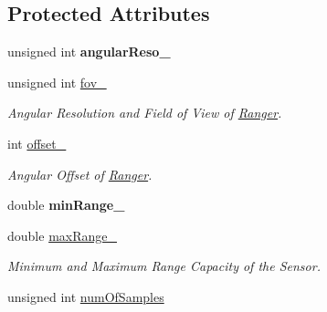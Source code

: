 \subsection*{Protected Attributes}
\begin{DoxyCompactItemize}
\item 
unsigned int {\bfseries angular\+Reso\+\_\+}\hypertarget{class_ranger_a53534cf242b7da6e4766016c24876d55}{}\label{class_ranger_a53534cf242b7da6e4766016c24876d55}

\item 
unsigned int \hyperlink{class_ranger_a013937201e2a4a516d4d36cac0193d68}{fov\+\_\+}\hypertarget{class_ranger_a013937201e2a4a516d4d36cac0193d68}{}\label{class_ranger_a013937201e2a4a516d4d36cac0193d68}

\begin{DoxyCompactList}\small\item\em Angular Resolution and Field of View of \hyperlink{class_ranger}{Ranger}. \end{DoxyCompactList}\item 
int \hyperlink{class_ranger_add17fe15ea0db50db1f678f9949cfc87}{offset\+\_\+}\hypertarget{class_ranger_add17fe15ea0db50db1f678f9949cfc87}{}\label{class_ranger_add17fe15ea0db50db1f678f9949cfc87}

\begin{DoxyCompactList}\small\item\em Angular Offset of \hyperlink{class_ranger}{Ranger}. \end{DoxyCompactList}\item 
double {\bfseries min\+Range\+\_\+}\hypertarget{class_ranger_a3dddeb9eb109baf567dfcd356706c6fb}{}\label{class_ranger_a3dddeb9eb109baf567dfcd356706c6fb}

\item 
double \hyperlink{class_ranger_aa92901df85f1818f27c0cf2e56ac2667}{max\+Range\+\_\+}\hypertarget{class_ranger_aa92901df85f1818f27c0cf2e56ac2667}{}\label{class_ranger_aa92901df85f1818f27c0cf2e56ac2667}

\begin{DoxyCompactList}\small\item\em Minimum and Maximum Range Capacity of the Sensor. \end{DoxyCompactList}\item 
unsigned int \hyperlink{class_ranger_a19d2d3776438ff0fe7060d3fcdc46111}{num\+Of\+Samples}\hypertarget{class_ranger_a19d2d3776438ff0fe7060d3fcdc46111}{}\label{class_ranger_a19d2d3776438ff0fe7060d3fcdc46111}


\end{DoxyCompactItemize}
